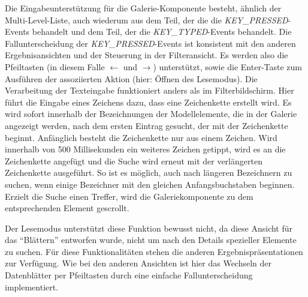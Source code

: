 Die Eingabeunterstützung für die Galerie-Komponente besteht, ähnlich der Multi-Level-Liste, auch wiederum aus dem Teil, der die die \textit{KEY\_{}PRESSED}-Events behandelt und dem Teil, der die \textit{KEY\_{}TYPED}-Events behandelt. Die Fallunterscheidung der \textit{KEY\_{}PRESSED}-Events ist konsistent mit den anderen Ergebnisansichten und der Steuerung in der Filteransicht. Es werden also die Pfeiltasten (in diesem Falle $\leftarrow$ und $\rightarrow$) unterstützt, sowie die Enter-Taste zum Ausführen der assoziierten Aktion (hier: Öffnen des Lesemodus). Die Verarbeitung der Texteingabe funktioniert anders als im Filterbildschirm. Hier führt die Eingabe eines Zeichens dazu, dass eine Zeichenkette erstellt wird. Es wird sofort innerhalb der Bezeichnungen der Modellelemente, die in der Galerie angezeigt werden, nach dem ersten Eintrag gesucht, der mit der Zeichenkette beginnt. Anfänglich besteht die Zeichenkette nur aus einem Zeichen. Wird innerhalb von 500 Millisekunden ein weiteres Zeichen getippt, wird es an die Zeichenkette angefügt und die Suche wird erneut mit der verlängerten Zeichenkette ausgeführt. So ist es möglich, auch nach längeren Bezeichnern zu suchen, wenn einige Bezeichner mit den gleichen Anfangsbuchstaben beginnen. Erzielt die Suche einen Treffer, wird die Galeriekomponente zu dem entsprechenden Element gescrollt.\par
Der Lesemodus unterstützt diese Funktion bewusst nicht, da diese Ansicht für das \enquote{Blättern} entworfen wurde, nicht um nach den Details spezieller Elemente zu suchen. Für diese Funktionalitäten stehen die anderen Ergebnispräsentationen zur Verfügung. Wie bei den anderen Ansichten ist hier das Wechseln der Datenblätter per Pfeiltasten durch eine einfache Fallunterscheidung implementiert. \par